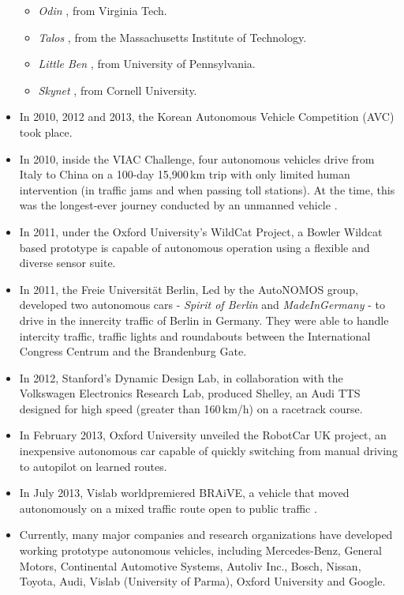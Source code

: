 \begin{itemize}
\begin{itemize}
  \item \emph{Odin} \citep{Bacha2008}, from Virginia Tech.
  \item \emph{Talos} \citep{leonard2007team}, from the Massachusetts Institute of Technology.
  \item \emph{Little Ben} \citep{bohren2008little}, from University of Pennsylvania.
  \item \emph{Skynet} \citep{miller2008team}, from Cornell University.
 \end{itemize}
 \item In 2010, 2012 and 2013, the Korean Autonomous Vehicle Competition (AVC) took place.
 \item In 2010, inside the VIAC Challenge, four autonomous vehicles drive from Italy to China on a 100-day 15,900\,km trip with only limited human intervention (in traffic jams and when passing toll stations). At the time, this was the longest-ever journey conducted by an unmanned vehicle \citep{Broggi2010VIAC}.
 \item In 2011, under the Oxford University's WildCat Project, a Bowler Wildcat based prototype is capable of autonomous operation using a flexible and diverse sensor suite.
 \item In 2011, the Freie Universität Berlin, Led by the AutoNOMOS group, developed two autonomous cars - \emph{Spirit of Berlin} \citep{berlin2007spirit} and \emph{MadeInGermany} \citep{gohring2013semi} - to drive in the innercity traffic of Berlin in Germany. They were able to handle intercity traffic, traffic lights and roundabouts between the International Congress Centrum and the Brandenburg Gate.
 \item In 2012, Stanford's Dynamic Design Lab, in collaboration with the Volkswagen Electronics Research Lab, produced Shelley, an Audi TTS designed for high speed (greater than 160\,km/h) on a racetrack course.
 \item In February 2013, Oxford University unveiled the RobotCar UK project, an inexpensive autonomous car capable of quickly switching from manual driving to autopilot on learned routes.
 \item In July 2013, Vislab worldpremiered BRAiVE, a vehicle that moved autonomously on a mixed traffic route open to public traffic \citep{grisleri2010braive}.
 \item Currently, many major companies and research organizations have developed working prototype autonomous vehicles, including Mercedes-Benz, General Motors, Continental Automotive Systems, Autoliv Inc., Bosch, Nissan, Toyota, Audi, Vislab (University of Parma), Oxford University and Google.
\end{itemize}
 
